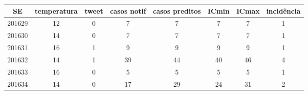 \begin{tabular}{c|ccccccc}
  \hline
SE & temperatura & tweet & casos notif & casos preditos & ICmin & ICmax & incidência \\ 
  \hline
201629 & 12 & 0 & 7 & 7 & 7 & 7 & 1 \\ 
  201630 & 14 & 0 & 7 & 7 & 7 & 7 & 1 \\ 
  201631 & 16 & 1 & 9 & 9 & 9 & 9 & 1 \\ 
  201632 & 14 & 1 & 39 & 44 & 40 & 46 & 4 \\ 
  201633 & 16 & 0 & 5 & 5 & 5 & 5 & 1 \\ 
  201634 & 14 & 0 & 17 & 29 & 24 & 31 & 2 \\ 
   \hline
\end{tabular}
